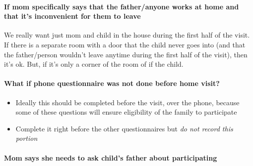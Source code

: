 \documentclass[
  12pt,
]{book}
\providecommand{\tightlist}{%
  \setlength{\itemsep}{0pt}\setlength{\parskip}{0pt}}
\begin{document}
\hypertarget{if-mom-specifically-says-that-the-fatheranyone-works-at-home-and-that-its-inconvenient-for-them-to-leave}{%
\paragraph*{If mom specifically says that the father/anyone works at home and that it's inconvenient for them to leave}\label{if-mom-specifically-says-that-the-fatheranyone-works-at-home-and-that-its-inconvenient-for-them-to-leave}}

We really want just mom and child in the house during the first half of the visit. If there is a separate room with a door that the child never goes into (and that the father/person wouldn't leave anytime during the first half of the visit), then it's ok. But, if it's only a corner of the room of if the child.

\hypertarget{what-if-phone-questionnaire-was-not-done-before-home-visit}{%
\paragraph*{What if phone questionnaire was not done before home visit?}\label{what-if-phone-questionnaire-was-not-done-before-home-visit}}

\begin{itemize}
\tightlist
\item
  Ideally this should be completed before the visit, over the phone, because some of these questions will ensure eligibility of the family to participate\\
\item
  Complete it right before the other questionnaires but \emph{do not record this portion}
\end{itemize}

\hypertarget{mom-says-she-needs-to-ask-childs-father-about-participating}{%
\paragraph*{Mom says she needs to ask child's father about participating}\label{mom-says-she-needs-to-ask-childs-father-about-participating}}
\end{document}

